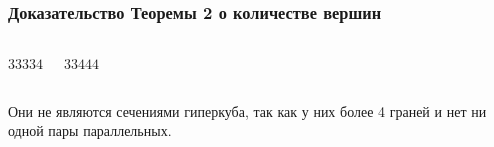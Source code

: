 \documentclass[10pt,pdf,hyperref={unicode}]{beamer}
\begin{document}
\begin{frame}
	\frametitle{Доказательство Теоремы 2 о количестве вершин}
	\begin{columns}
		{\large $33334$}

		{\large $33444$}
	\end{columns}
	Они не являются сечениями гиперкуба, так как у них более 4 граней и нет ни одной пары параллельных.
\end{frame}
\end{document}
